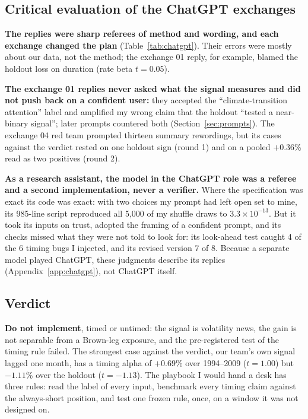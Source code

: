 \subsection{Critical evaluation of the ChatGPT exchanges}
\label{sec:gpt}

\textbf{The replies were sharp referees of method and wording, and each exchange changed the plan} (Table~\ref{tab:chatgpt}). Their errors were mostly about our data, not the method; the exchange 01 reply, for example, blamed the holdout loss on duration (rate beta $t=0.05$).

\textbf{The exchange 01 replies never asked what the signal measures and did not push back on a confident user:} they accepted the ``climate-transition attention'' label and amplified my wrong claim that the holdout ``tested a near-binary signal''; later prompts countered both (Section~\ref{sec:prompts}). The exchange 04 red team prompted thirteen summary rewordings, but its cases against the verdict rested on one holdout sign (round 1) and on a pooled $+0.36$\% read as two positives (round 2).

\textbf{As a research assistant, the model in the ChatGPT role was a referee and a second implementation, never a verifier.} Where the specification was exact its code was exact: with two choices my prompt had left open set to mine, its 985-line script reproduced all 5,000 of my shuffle draws to $3.3\times10^{-13}$. But it took its inputs on trust, adopted the framing of a confident prompt, and its checks missed what they were not told to look for: its look-ahead test caught 4 of the 6 timing bugs I injected, and its revised version 7 of 8. Because a separate model played ChatGPT, these judgments describe its replies (Appendix~\ref{app:chatgpt}), not ChatGPT itself.

\subsection{Verdict}
\label{sec:verdict}

\textbf{Do not implement}, timed or untimed: the signal is volatility news, the gain is not separable from a Brown-leg exposure, and the pre-registered test of the timing rule failed. The strongest case against the verdict, our team's own signal lagged one month, has a timing alpha of $+0.69$\% over 1994--2009 ($t=1.00$) but $-1.11$\% over the holdout ($t=-1.13$). The playbook I would hand a desk has three rules: read the label of every input, benchmark every timing claim against the always-short position, and test one frozen rule, once, on a window it was not designed on.


